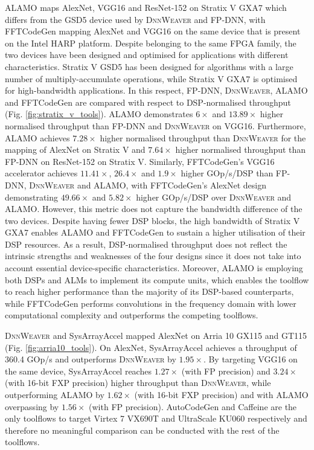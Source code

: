 \documentclass[format=acmsmall, review=false, screen=true]{acmart}
\begin{document}
ALAMO maps AlexNet, VGG16 and ResNet-152 on Stratix V GXA7 which differs from the GSD5 device used by \textsc{DnnWeaver} and FP-DNN, {\color{black}with FFTCodeGen mapping AlexNet and VGG16 on the same device that is present on the Intel HARP platform}. Despite belonging to the same FPGA family, the two devices have been designed and optimised for applications with different characteristics. Stratix V GSD5 has been designed for algorithms with a large number of multiply-accumulate operations, while Stratix V GXA7 is optimised for high-bandwidth applications. In this respect, FP-DNN, \textsc{DnnWeaver}, ALAMO and FFTCodeGen are compared with respect to DSP-normalised throughput (Fig. \ref{fig:stratix_v_tools}). ALAMO demonstrates {\color{black}$6 \times$ and $13.89\times$ higher normalised throughput than FP-DNN and \textsc{DnnWeaver} on VGG16. Furthermore, ALAMO achieves $7.28\times$ higher normalised throughput than \textsc{DnnWeaver} for the mapping of AlexNet on Stratix V and $7.64\times$ higher normalised throughput than FP-DNN on ResNet-152 on Stratix V. Similarly, FFTCodeGen's VGG16 accelerator achieves $11.41\times$, $26.4\times$ and $1.9\times$ higher GOp/s/DSP than FP-DNN, \textsc{DnnWeaver} and ALAMO, with FFTCodeGen's AlexNet design demonstrating $49.66\times$ and $5.82\times$ higher GOp/s/DSP over \textsc{DnnWeaver} and ALAMO.} However, this metric does not capture the bandwidth difference of the two devices. Despite having fewer DSP blocks, the high bandwidth of Stratix V GXA7 enables ALAMO and FFTCodeGen to sustain a higher utilisation of their DSP resources. As a result, DSP-normalised throughput does not reflect the intrinsic strengths and weaknesses of the four designs since it does not take into account essential device-specific characteristics. {\color{black}Moreover, ALAMO is employing both DSPs and ALMs to implement its compute units, which enables the toolflow to reach higher performance than the majority of its DSP-based counterparts, while FFTCodeGen performs convolutions in the frequency domain with lower computational complexity and outperforms the competing toolflows.}




\textsc{DnnWeaver} and SysArrayAccel mapped AlexNet on Arria 10 GX115 and GT115 (Fig. \ref{fig:arria10_tools}). On AlexNet, SysArrayAccel achieves a throughput of 360.4 GOp/s and outperforms \textsc{DnnWeaver} by $1.95\times$. By targeting VGG16 on the same device, SysArrayAccel reaches $1.27\times$ (with FP precision) and $3.24\times$ (with 16-bit FXP precision) higher throughput than \textsc{DnnWeaver}, while outperforming ALAMO by $1.62\times$ (with 16-bit FXP precision) {\color{black}and with ALAMO overpassing by $1.56\times$ (with FP precision). AutoCodeGen and Caffeine are the only toolflows to target Virtex 7 VX690T and UltraScale KU060 respectively and therefore no meaningful comparison can be conducted with the rest of the toolflows.}
\end{document}
